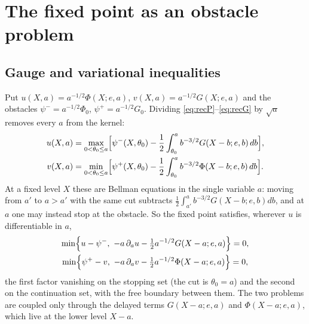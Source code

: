 \documentclass[11pt]{amsart}
\theoremstyle{remark}
\begin{document}
\section{The fixed point as an obstacle problem}\label{sec:obstacle}
\subsection{Gauge and variational inequalities}
Put $u(X,a)=a^{-1/2}\Phi(X;e,a)$, $v(X,a)=a^{-1/2}G(X;e,a)$ and the obstacles $\psi^-=a^{-1/2}\Phi_0$, $\psi^+=a^{-1/2}G_0$. Dividing \eqref{eq:recP}--\eqref{eq:recG} by $\sqrt a$ removes every $a$ from the kernel:
\begin{align}
u(X,a)&=\max_{0<\theta_0\le a}\Bigl[\psi^-(X,\theta_0)-\frac12\int_{\theta_0}^ab^{-3/2}G(X-b;e,b)\,db\Bigr],\label{eq:u}\\
v(X,a)&=\min_{0<\theta_0\le a}\Bigl[\psi^+(X,\theta_0)-\frac12\int_{\theta_0}^ab^{-3/2}\Phi(X-b;e,b)\,db\Bigr].\label{eq:v}
\end{align}
At a fixed level $X$ these are Bellman equations in the single variable $a$: moving from $a'$ to $a>a'$ with the same cut subtracts $\frac12\int_{a'}^ab^{-3/2}G(X-b;e,b)db$, and at $a$ one may instead stop at the obstacle. So the fixed point satisfies, wherever $u$ is differentiable in $a$,
\begin{gather}
\min\Bigl\{u-\psi^-,\ -a\,\partial_au-\tfrac12a^{-1/2}G(X-a;e,a)\Bigr\}=0,\label{eq:hjb}\\
\min\Bigl\{\psi^+-v,\ -a\,\partial_av-\tfrac12a^{-1/2}\Phi(X-a;e,a)\Bigr\}=0 ,\notag
\end{gather}
the first factor vanishing on the stopping set (the cut is $\theta_0=a$) and the second on the continuation set, with the free boundary between them. The two problems are coupled only through the delayed terms $G(X-a;e,a)$ and $\Phi(X-a;e,a)$, which live at the lower level $X-a$.
\end{document}
